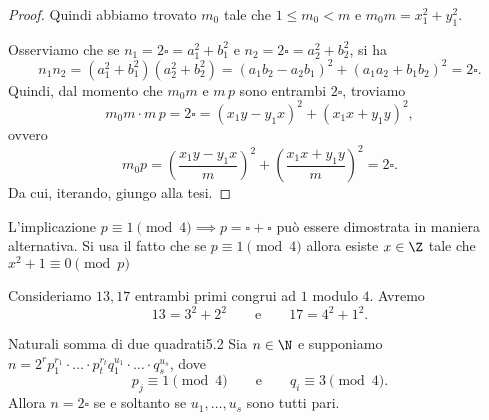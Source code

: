 \begin{proof}
	Quindi abbiamo trovato \(m_0\) tale che \(1 \le m_0 < m\) e \(m_0 m = x_1^2 + y_1^2\).

	Osserviamo che se \(n_1 = 2\square = a_1^2 + b_1^2\) e \(n_2 = 2\square = a_2^2 + b_2^2\), si ha
	\[
		n_1 n_2 = (a_1^2+b_1^2)(a_2^2+b_2^2) = (a_1 b_2 - a_2 b_1)^2 + (a_1 a_2 + b_1 b_2)^2 = 2\square.
	\]
	Quindi, dal momento che \(m_0 m\) e \(m\, p\) sono entrambi \(2\square\), troviamo
	\[
		m_0 m \cdot m\,p = 2\square = (x_1 y-y_1 x)^2 + (x_1 x+y_1 y)^2,
	\]
	ovvero
	\[
		m_0 p = \left( \frac{x_1 y-y_1 x}{m} \right)^2 + \left( \frac{x_1 x+y_1 y}{m} \right)^2 = 2\square.
	\]
	Da cui, iterando, giungo alla tesi.
\end{proof}

\begin{oss}
	L'implicazione \(p\equiv 1 \pmod{4} \implies p = \square + \square\) può essere dimostrata in maniera alternativa.
	Si usa il fatto che se \(p \equiv 1 \pmod{4}\) allora esiste \(x\in \Z\) tale che \(x^2 + 1 \equiv 0 \pmod{p}\)
\end{oss}

\begin{ese}
	Consideriamo \(13,17\) entrambi primi congrui ad \(1\) modulo \(4\).
	Avremo
	\[
		13 = 3^2+2^2 \qquad\text{e}\qquad 17 = 4^2+1^2.
	\]
\end{ese}

\begin{teor}{Naturali somma di due quadrati}{5.2}
	Sia \(n\in\N\) e supponiamo \(n=2^r p_1^{r_1} \cdot\ldots\cdot p_t^{r_t} q_1^{u_1} \cdot\ldots\cdot q_s^{u_s}\), dove
	\[
		p_j \equiv 1 \pmod{4} \qquad\text{e}\qquad q_i \equiv 3 \pmod{4}.
	\]
	Allora \(n=2\square\) se e soltanto se \(u_1,\ldots,u_s\) sono tutti pari.
\end{teor}

